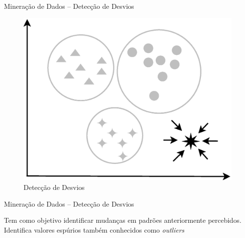 \documentclass[hyperref={pdfpagelabels=false}]{beamer}
\begin{document}
\begin{frame}
    
    \Large{Mineração de Dados -- Detecção de Desvios}
    
        \begin{figure}
		\centering
	    \includegraphics[scale=0.3]{img/Outlier.eps}
        \caption{\scriptsize{Detecção de Desvios}}
		\end{figure}

\end{frame}

\begin{frame}

    
    \Large{Mineração de Dados -- Detecção de Desvios}\linebreak
    \normalsize
   
    Tem como objetivo identificar mudanças em padrões anteriormente percebidos. \cite{goldschmidt2015data}
    \linebreak\linebreak Identifica valores espúrios também conhecidos como \textit{outliers}

\end{frame}
\end{document}
